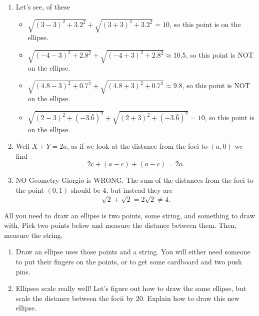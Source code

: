\documentclass[nooutcomes,noauthor,handout]{../ximera}
\begin{document}
\begin{question}
  \begin{freeResponse}
    \begin{enumerate}
    \item Let's see, of these
      \begin{itemize}
      \item $\sqrt{(3-3)^2+3.2^2} + \sqrt{(3+3)^2 + 3.2^2} = 10$, so this point is on the ellipse.
      \item $\sqrt{(-4-3)^2+2.8^2} + \sqrt{(-4+3)^2 + 2.8^2} \approx 10.5$, so this point is NOT on the ellipse.
      \item $\sqrt{(4.8-3)^2+0.7^2} + \sqrt{(4.8+3)^2 + 0.7^2} \approx 9.8$, so this point is NOT on the ellipse.
      \item $\sqrt{(2-3)^2+(-3.\bar{6})^2} + \sqrt{(2+3)^2 + (-3.\bar{6})^2} = 10$, so this point is on the ellipse.
      \end{itemize}
    \item Well $X+Y=2a$, as if we look at the distance from the foci to $(a,0)$ we find
      \[
      2c + (a-c) + (a-c) = 2a.
      \]
    \item NO Geometry Giorgio is WRONG. The sum of the distances from
      the foci to the point $(0,1)$ should be $4$, but instead they
      are
      \[
      \sqrt{2} + \sqrt{2} = 2\sqrt{2} \ne 4.
      \]
    \end{enumerate}
  \end{freeResponse}
\end{question}
\mynewpage

\begin{question} %
 All you need to draw an ellipse is two points, some string, and something to draw with. Pick two points below and measure the distance between them. Then, measure the string.
 
\begin{enumerate}
 \item Draw an ellipse uses those points and a string. You will either need someone to put their fingers on the points, or to get some cardboard and two push pins.
\item Ellipses scale really well! Let's figure out how to draw the same ellipse, but scale the distance between the focii by 20. Explain how to draw this new ellipse.
\end{enumerate}
  
 
\end{question}
\mynewpage
\end{document}
